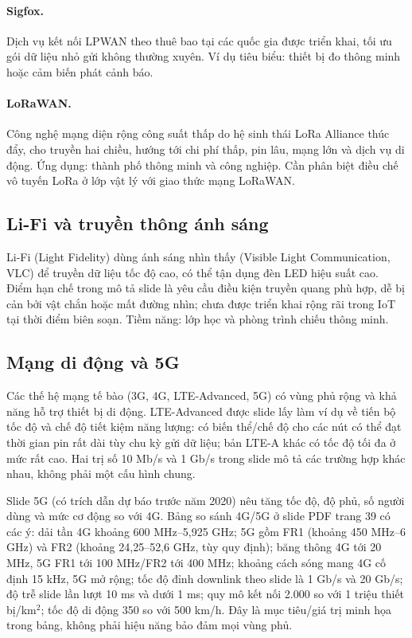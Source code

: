 \paragraph{Sigfox.} Dịch vụ kết nối LPWAN theo thuê bao tại các quốc gia được triển khai, tối ưu gói dữ liệu nhỏ gửi không thường xuyên. Ví dụ tiêu biểu: thiết bị đo thông minh hoặc cảm biến phát cảnh báo. 

\paragraph{LoRaWAN.} Công nghệ mạng diện rộng công suất thấp do hệ sinh thái LoRa Alliance thúc đẩy, cho truyền hai chiều, hướng tới chi phí thấp, pin lâu, mạng lớn và dịch vụ di động. Ứng dụng: thành phố thông minh và công nghiệp. Cần phân biệt điều chế vô tuyến LoRa ở lớp vật lý với giao thức mạng LoRaWAN. 

\subsection{Li-Fi và truyền thông ánh sáng}
Li-Fi (Light Fidelity) dùng ánh sáng nhìn thấy (Visible Light Communication, VLC) để truyền dữ liệu tốc độ cao, có thể tận dụng đèn LED hiệu suất cao. Điểm hạn chế trong mô tả slide là yêu cầu điều kiện truyền quang phù hợp, dễ bị cản bởi vật chắn hoặc mất đường nhìn; chưa được triển khai rộng rãi trong IoT tại thời điểm biên soạn. Tiềm năng: lớp học và phòng trình chiếu thông minh. 

\subsection{Mạng di động và 5G}
Các thế hệ mạng tế bào (3G, 4G, LTE-Advanced, 5G) có vùng phủ rộng và khả năng hỗ trợ thiết bị di động. LTE-Advanced được slide lấy làm ví dụ về tiến bộ tốc độ và chế độ tiết kiệm năng lượng: có biến thể/chế độ cho các nút có thể đạt thời gian pin rất dài tùy chu kỳ gửi dữ liệu; bản LTE-A khác có tốc độ tối đa ở mức rất cao. Hai trị số 10 Mb/s và 1 Gb/s trong slide mô tả các trường hợp khác nhau, không phải một cấu hình chung. 

Slide 5G (có trích dẫn dự báo trước năm 2020) nêu tăng tốc độ, độ phủ, số người dùng và mức cơ động so với 4G. Bảng so sánh 4G/5G ở slide PDF trang 39 có các ý: dải tần 4G khoảng 600 MHz--5,925 GHz; 5G gồm FR1 (khoảng 450 MHz--6 GHz) và FR2 (khoảng 24,25--52,6 GHz, tùy quy định); băng thông 4G tới 20 MHz, 5G FR1 tới 100 MHz/FR2 tới 400 MHz; khoảng cách sóng mang 4G cố định 15 kHz, 5G mở rộng; tốc độ đỉnh downlink theo slide là 1 Gb/s và 20 Gb/s; độ trễ slide lần lượt 10 ms và dưới 1 ms; quy mô kết nối 2.000 so với 1 triệu thiết bị/km$^2$; tốc độ di động 350 so với 500 km/h. Đây là mục tiêu/giá trị minh họa trong bảng, không phải hiệu năng bảo đảm mọi vùng phủ. 

